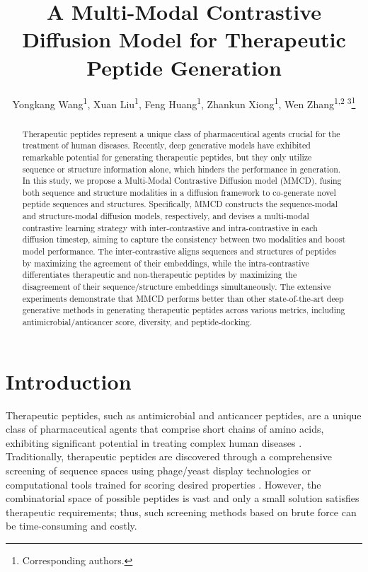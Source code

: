 \documentclass[letterpaper]{article}
\title{A Multi-Modal Contrastive Diffusion Model for Therapeutic Peptide Generation}
\author {
    Yongkang Wang\textsuperscript{\rm 1}\equalcontrib ,
    Xuan Liu\textsuperscript{\rm 1}\equalcontrib ,
    Feng Huang\textsuperscript{\rm 1},
    Zhankun Xiong\textsuperscript{\rm 1},
    Wen Zhang\textsuperscript{\rm 1,\rm 2 \rm 3}\thanks{Corresponding authors.}
}
\begin{document}
\maketitle
\begin{abstract}
Therapeutic peptides represent a unique class of pharmaceutical agents crucial for the treatment of human diseases. Recently, deep generative models have exhibited remarkable potential for generating therapeutic peptides, but they only utilize sequence or structure information alone, which hinders the performance in generation. In this study, we propose a Multi-Modal Contrastive Diffusion model (MMCD), fusing both sequence and structure modalities in a diffusion framework to co-generate novel peptide sequences and structures. Specifically, MMCD constructs the sequence-modal and structure-modal diffusion models, respectively, and devises a multi-modal contrastive learning strategy with inter-contrastive and intra-contrastive in each diffusion timestep, aiming to capture the consistency between two modalities and boost model performance. The inter-contrastive aligns sequences and structures of peptides by maximizing the agreement of their embeddings, while the intra-contrastive differentiates therapeutic and non-therapeutic peptides by maximizing the disagreement of their sequence/structure embeddings simultaneously. The extensive experiments demonstrate that MMCD performs better than other state-of-the-art deep generative methods in generating therapeutic peptides across various metrics, including antimicrobial/anticancer score, diversity, and peptide-docking.
\end{abstract}

\section{Introduction}
Therapeutic peptides, such as antimicrobial and anticancer peptides, are a unique class of pharmaceutical agents that comprise short chains of amino acids, exhibiting significant potential in treating complex human diseases \cite{jakubczykCurrentTrends2020}. Traditionally, therapeutic peptides are discovered through a comprehensive screening of sequence spaces using phage/yeast display technologies \cite{muttenthaler2021trends} or computational tools trained for scoring desired properties \cite{leeWhatCan2017, leeMachineLearningenabled2018}. However, the combinatorial space of possible peptides is vast and only a small solution satisfies therapeutic requirements; thus, such screening methods based on brute force can be time-consuming and costly.
\end{document}
